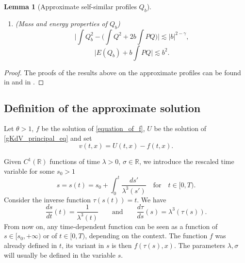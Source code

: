 \documentclass[16pt,english, oneside,reqno]{smfart}
\newcommand{\RR}{\mathbb{R}}
\newtheorem{lemma}[theorem]{Lemma}
\begin{document}
\begin{lemma}[Approximate self-similar profiles $Q_b$]
\begin{enumerate}
        \item (Mass and energy properties of $Q_b$)
        \begin{equation}\label{estimate_mass_of_Qb}
            \bigg\lvert \int Q^2_b - \Big( \int Q^2 + 2b \int P Q \Big) \bigg\rvert \lesssim |b|^{2-\gamma},
        \end{equation}
        \begin{equation}\label{estimate_energy_of_Qb}
            \bigg\lvert E(Q_b) + b \int P Q \bigg\rvert \lesssim b^2.
        \end{equation}
    \end{enumerate}
\end{lemma}
\begin{proof}
The proofs of the results above on the approximate profiles
can be found in \cite[Lemma 2.4]{MMPI} and in \cite[Lemma 3.3]{Martel-Pilod}.
\end{proof}


\subsection{Definition of the approximate solution}
Let $\theta> 1$, $f$ be the solution of \eqref{equation_of_f},  $U$ be the solution of \eqref{gKdV_principal_eq} and set
\begin{equation}\label{Umoinsf}
    v(t,x) = U(t,x)-f(t,x).
\end{equation}

\vspace{0.3cm}
Given $C^1(\RR)$ functions of time $\lambda>0$, $\sigma\in\RR$,
we introduce the rescaled time variable for some $s_0 >1$
\begin{equation}\label{def_of_rescaled_time}
    s= s(t) = s_0 + \int^t_{0}\frac{d s'}{\lambda^3(s')} \quad \text{for} \quad t\in [0,T).
\end{equation}
Consider the inverse function $\tau(s(t)) = t$. We have
\begin{equation}\label{relation_on_diff_of_tau_and_zeta}
    \frac{d s}{dt}(t) = \frac{1}{\lambda^3(t)} \qquad \text{and}\qquad \frac{d \tau}{ds}(s) = \lambda^3(\tau(s)).
\end{equation}
From now on, any time-dependent function can be seen as a function of $s\in [s_0,+\infty)$ or of $t \in [0,T)$, depending on the context. 
The function $f$ was already defined in $t$, its variant in $s$ is then $f(\tau(s),x)$. The parameters $\lambda,\sigma$ will usually be defined in the variable $s$.
\end{document}

